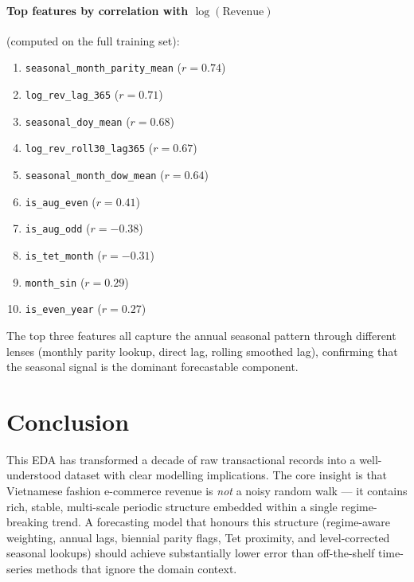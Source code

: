 \documentclass{article}
\begin{document}
\paragraph{Top features by correlation with $\log(\text{Revenue})$}
(computed on the full training set):

\begin{enumerate}[leftmargin=1.5em, itemsep=2pt]
  \item \texttt{seasonal\_month\_parity\_mean} ($r = 0.74$)
  \item \texttt{log\_rev\_lag\_365} ($r = 0.71$)
  \item \texttt{seasonal\_doy\_mean} ($r = 0.68$)
  \item \texttt{log\_rev\_roll30\_lag365} ($r = 0.67$)
  \item \texttt{seasonal\_month\_dow\_mean} ($r = 0.64$)
  \item \texttt{is\_aug\_even} ($r = 0.41$)
  \item \texttt{is\_aug\_odd} ($r = -0.38$)
  \item \texttt{is\_tet\_month} ($r = -0.31$)
  \item \texttt{month\_sin} ($r = 0.29$)
  \item \texttt{is\_even\_year} ($r = 0.27$)
\end{enumerate}

The top three features all capture the annual seasonal pattern through different
lenses (monthly parity lookup, direct lag, rolling smoothed lag), confirming
that the seasonal signal is the dominant forecastable component.

\section{Conclusion}
\label{sec:conclusion}

This EDA has transformed a decade of raw transactional records into a
well-understood dataset with clear modelling implications.
The core insight is that Vietnamese fashion e-commerce revenue is \emph{not}
a noisy random walk — it contains rich, stable, multi-scale periodic structure
embedded within a single regime-breaking trend.
A forecasting model that honours this structure (regime-aware weighting, annual
lags, biennial parity flags, Tet proximity, and level-corrected seasonal
lookups) should achieve substantially lower error than off-the-shelf time-series
methods that ignore the domain context.
\end{document}
